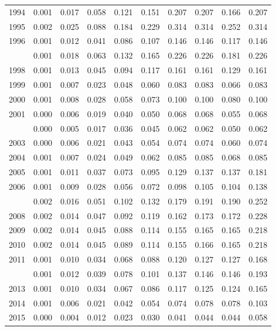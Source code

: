 \documentclass[
]{article}
\begin{document}
\begin{longtable}[t]{lrrrrrrrrr}
1994 & 0.001 & 0.017 & 0.058 & 0.121 & 0.151 & 0.207 & 0.207 & 0.166 & 0.207\\
1995 & 0.002 & 0.025 & 0.088 & 0.184 & 0.229 & 0.314 & 0.314 & 0.252 & 0.314\\
1996 & 0.001 & 0.012 & 0.041 & 0.086 & 0.107 & 0.146 & 0.146 & 0.117 & 0.146\\
\addlinespace
1997 & 0.001 & 0.018 & 0.063 & 0.132 & 0.165 & 0.226 & 0.226 & 0.181 & 0.226\\
1998 & 0.001 & 0.013 & 0.045 & 0.094 & 0.117 & 0.161 & 0.161 & 0.129 & 0.161\\
1999 & 0.001 & 0.007 & 0.023 & 0.048 & 0.060 & 0.083 & 0.083 & 0.066 & 0.083\\
2000 & 0.001 & 0.008 & 0.028 & 0.058 & 0.073 & 0.100 & 0.100 & 0.080 & 0.100\\
2001 & 0.000 & 0.006 & 0.019 & 0.040 & 0.050 & 0.068 & 0.068 & 0.055 & 0.068\\
\addlinespace
2002 & 0.000 & 0.005 & 0.017 & 0.036 & 0.045 & 0.062 & 0.062 & 0.050 & 0.062\\
2003 & 0.000 & 0.006 & 0.021 & 0.043 & 0.054 & 0.074 & 0.074 & 0.060 & 0.074\\
2004 & 0.001 & 0.007 & 0.024 & 0.049 & 0.062 & 0.085 & 0.085 & 0.068 & 0.085\\
2005 & 0.001 & 0.011 & 0.037 & 0.073 & 0.095 & 0.129 & 0.137 & 0.137 & 0.181\\
2006 & 0.001 & 0.009 & 0.028 & 0.056 & 0.072 & 0.098 & 0.105 & 0.104 & 0.138\\
\addlinespace
2007 & 0.002 & 0.016 & 0.051 & 0.102 & 0.132 & 0.179 & 0.191 & 0.190 & 0.252\\
2008 & 0.002 & 0.014 & 0.047 & 0.092 & 0.119 & 0.162 & 0.173 & 0.172 & 0.228\\
2009 & 0.002 & 0.014 & 0.045 & 0.088 & 0.114 & 0.155 & 0.165 & 0.165 & 0.218\\
2010 & 0.002 & 0.014 & 0.045 & 0.089 & 0.114 & 0.155 & 0.166 & 0.165 & 0.218\\
2011 & 0.001 & 0.010 & 0.034 & 0.068 & 0.088 & 0.120 & 0.127 & 0.127 & 0.168\\
\addlinespace
2012 & 0.001 & 0.012 & 0.039 & 0.078 & 0.101 & 0.137 & 0.146 & 0.146 & 0.193\\
2013 & 0.001 & 0.010 & 0.034 & 0.067 & 0.086 & 0.117 & 0.125 & 0.124 & 0.165\\
2014 & 0.001 & 0.006 & 0.021 & 0.042 & 0.054 & 0.074 & 0.078 & 0.078 & 0.103\\
2015 & 0.000 & 0.004 & 0.012 & 0.023 & 0.030 & 0.041 & 0.044 & 0.044 & 0.058\\

\end{longtable}
\end{document}
